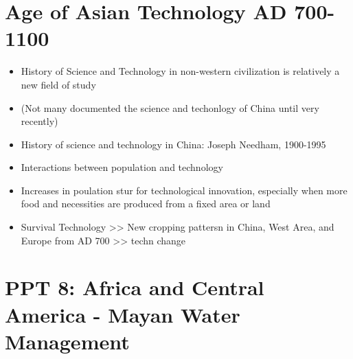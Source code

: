 \documentclass{article}
\begin{document}
\section*{Age of Asian Technology AD 700-1100}
\begin{itemize}
  \item History of Science and Technology in non-western civilization is relatively a new
    field of study
  \item (Not many documented the science and techonlogy of China until very recently)
  \item History of science and technology in China:
    Joseph Needham, 1900-1995
  \item Interactions between population and technology
  \item Increases in poulation stur for technological innovation,
    especially when more food and necessities are produced from a
    fixed area or land
  \item Survival Technology >> New cropping pattersn in China, West Area, and Europe from AD 700 >>
    techn change
\end{itemize}


\section{PPT 8: Africa and Central America - Mayan Water Management}
\end{document}
